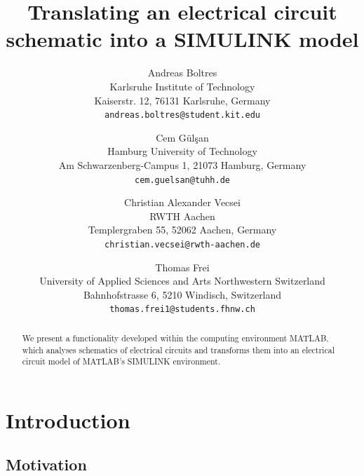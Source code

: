 \documentclass[10pt,twocolumn,letterpaper]{article}
\begin{document}
\title{Translating an electrical circuit schematic into a SIMULINK model}

\author{Andreas Boltres\\
Karlsruhe Institute of Technology\\
Kaiserstr. 12, 76131 Karlsruhe, Germany\\
{\tt\small andreas.boltres@student.kit.edu}
\and
Cem G\"ul\c{s}an\\
Hamburg University of Technology\\
Am Schwarzenberg-Campus 1, 21073 Hamburg, Germany\\
{\tt\small cem.guelsan@tuhh.de}
\and
Christian Alexander Vecsei\\
RWTH Aachen\\
Templergraben 55, 52062 Aachen, Germany\\
{\tt\small christian.vecsei@rwth-aachen.de}
\and
Thomas Frei\\
University of Applied Sciences and Arts Northwestern Switzerland\\
Bahnhofstrasse 6, 5210 Windisch, Switzerland\\
{\tt\small thomas.frei1@students.fhnw.ch}
}

\maketitle


\begin{abstract}
We present a functionality developed within the computing environment MATLAB, which analyses schematics of electrical circuits and transforms them into an electrical circuit model of MATLAB's SIMULINK environment.
\end{abstract}


\section{Introduction}
\label{sec:intro}

\subsection{Motivation}
\label{subsec:moti}
\end{document}

